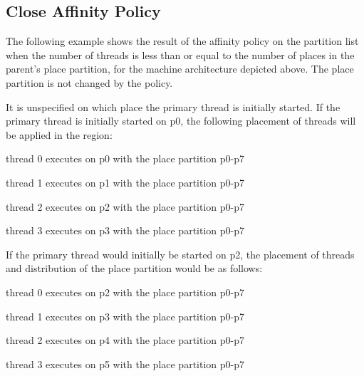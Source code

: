 \subsection{Close Affinity Policy}
\label{subsec:affinity_close}

The following example shows the result of the  affinity policy on 
the partition list when the number of threads is less than or equal to the number 
of places in the parent's place partition, for the machine architecture depicted above. 
The place partition is not changed by the  policy.


\clearpage

It is unspecified on which place the primary thread is initially started. If the 
primary thread is initially started on p0, the following placement of threads will 
be applied in the  region:

\begin{compactitem}
\item thread 0 executes on p0 with the place partition p0-p7

\item thread 1 executes on p1 with the place partition p0-p7

\item thread 2 executes on p2 with the place partition p0-p7

\item thread 3 executes on p3 with the place partition p0-p7
\end{compactitem}

If the primary thread would initially be started on p2, the placement of threads 
and distribution of the place partition would be as follows:

\begin{compactitem}
\item thread 0 executes on p2 with the place partition p0-p7

\item thread 1 executes on p3 with the place partition p0-p7

\item thread 2 executes on p4 with the place partition p0-p7

\item thread 3 executes on p5 with the place partition p0-p7
\end{compactitem}

